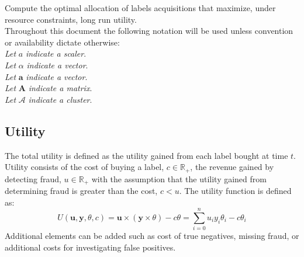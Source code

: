 Compute the optimal allocation of labels acquisitions that maximize, under resource constraints, long run utility.\\

Throughout this document the following notation will be used unless convention or availability dictate otherwise:\\

\textit{Let} $a$ \textit{indicate a scaler}.\\
\textit{Let} $\alpha$ \textit{indicate a vector}.\\
\textit{Let} $\mathbf{a}$ \textit{indicate a vector}.\\
\textit{Let} $\mathbf{A}$ \textit{indicate a matrix}.\\
\textit{Let} $\mathcal{A}$ \textit{indicate a cluster}.

\subsection*{Utility}
The total utility is defined as the utility gained from each label bought at time $t$.
Utility consists of the cost of buying a label, $c \in \mathbb{R_{+}}$, the revenue gained by detecting fraud, $u \in \mathbb{R_+}$ with the assumption that the
utility gained from determining fraud is greater than the cost, $c < u$.
The utility function is defined as:
\begin{equation}
U(\textbf{u}, \mathbf{y}, \theta, c) = \textbf{u} \times (\textbf{y} \times \theta) - c \theta = \sum_{i=0}^{n}u_{i}y_{i}\theta_{i} - c\theta_{i}
\end{equation}
Additional elements can be added such as cost of true negatives, missing fraud, or additional costs for investigating false positives.\\
